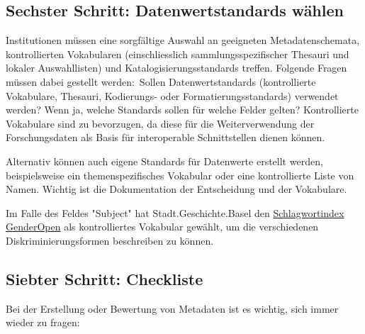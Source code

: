 \documentclass[
  nswissgerman,
  letterpaper,
  DIV=11,
  numbers=noendperiod]{scrartcl}
\begin{document}
\subsection{Sechster Schritt: Datenwertstandards
wählen}\label{sechster-schritt-datenwertstandards-wuxe4hlen}

Institutionen müssen eine sorgfältige Auswahl an geeigneten
Metadatenschemata, kontrollierten Vokabularen (einschliesslich
sammlungsspezifischer Thesauri und lokaler Auswahllisten) und
Katalogisierungsstandards treffen. Folgende Fragen müssen dabei gestellt
werden:~Sollen Datenwertstandards (kontrollierte Vokabulare, Thesauri,
Kodierungs- oder Formatierungsstandards) verwendet werden? Wenn ja,
welche Standards sollen für welche Felder gelten? Kontrollierte
Vokabulare sind zu bevorzugen, da diese für die Weiterverwendung der
Forschungsdaten als Basis für interoperable Schnittstellen dienen
können.

Alternativ können auch eigene Standards für Datenwerte erstellt werden,
beispielsweise ein themenspezifisches Vokabular oder eine kontrollierte
Liste von Namen. Wichtig ist die Dokumentation der Entscheidung und der
Vokabulare.

\begin{tcolorbox}[enhanced jigsaw, arc=.35mm, bottomrule=.15mm, bottomtitle=1mm, breakable, colback=white, colbacktitle=quarto-callout-tip-color!10!white, colframe=quarto-callout-tip-color-frame, coltitle=black, left=2mm, leftrule=.75mm, opacityback=0, opacitybacktitle=0.6, rightrule=.15mm, title=\textcolor{quarto-callout-tip-color}{\faLightbulb}\hspace{0.5em}{Erfahrungen der Stadt.Geschichte.Basel}, titlerule=0mm, toprule=.15mm, toptitle=1mm]

Im Falle des Feldes "Subject" hat Stadt.Geschichte.Basel den
\href{https://opengenderplatform.de/schlagwortindex}{Schlagwortindex
GenderOpen} als kontrolliertes Vokabular gewählt, um die verschiedenen
Diskriminierungsformen beschreiben zu können.

\end{tcolorbox}

\subsection{Siebter Schritt:
Checkliste}\label{siebter-schritt-checkliste}

Bei der Erstellung oder Bewertung von Metadaten ist es wichtig, sich
immer wieder zu fragen:
\end{document}
